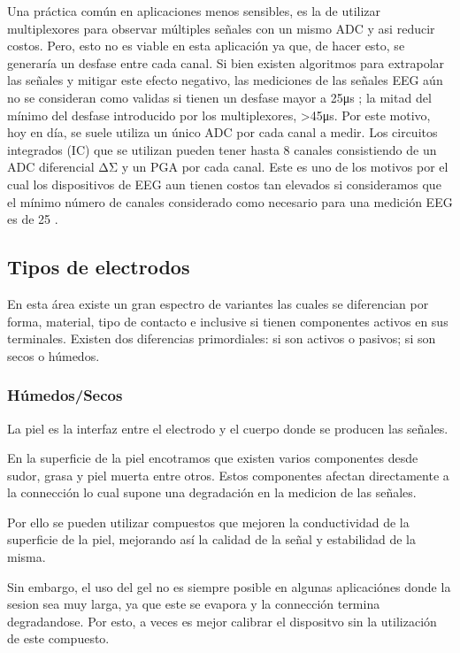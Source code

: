 Una práctica común en aplicaciones menos sensibles, es la de utilizar multiplexores para observar múltiples señales con un mismo ADC y asi reducir costos. Pero, esto no es viable en esta aplicación ya que, de hacer esto, se generaría un desfase entre cada canal. Si bien existen algoritmos para extrapolar las señales y mitigar este efecto negativo, las mediciones de las señales EEG aún no se consideran como validas si tienen un desfase mayor a 25μs \cite{IFCN1999a}; la mitad del mínimo del desfase introducido por los multiplexores, >45μs. Por este motivo, hoy en día, se suele utiliza un único ADC por cada canal a medir. Los circuitos integrados (IC) que se utilizan pueden tener hasta 8 canales consistiendo de un ADC diferencial ΔΣ y un PGA por cada canal. Este es uno de los motivos por el cual los dispositivos de EEG aun tienen costos tan elevados si consideramos que el mínimo número de canales considerado como necesario para una medición EEG es de 25 \cite{IFCN1999a}.

\subsection{Tipos de electrodos}
\label{sec:org9c4292c}
En esta área existe un gran espectro de variantes las cuales se diferencian por forma, material, tipo de contacto e inclusive si tienen componentes activos en sus terminales. Existen dos diferencias primordiales: si son activos o pasivos; si son secos o húmedos.

\subsubsection{Húmedos/Secos}
\label{sec:org73d4662}
La piel es la interfaz entre el electrodo y el cuerpo donde se producen las señales.

En la superficie de la piel encotramos que existen varios componentes desde sudor, grasa y piel muerta entre otros. Estos componentes afectan directamente a la connección lo cual supone una degradación en la medicion de las señales.

Por ello se pueden utilizar compuestos que mejoren la conductividad de la superficie de la piel, mejorando así la calidad de la señal y estabilidad de la misma.

Sin embargo, el uso del gel no es siempre posible en algunas aplicaciónes donde la sesion sea muy larga, ya que este se evapora y la connección termina degradandose. Por esto, a veces es mejor calibrar el dispositvo sin la utilización de este compuesto.

